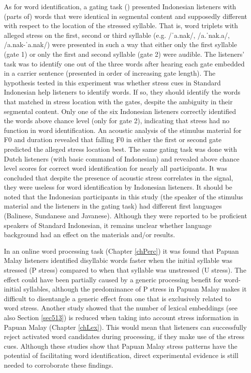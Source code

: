 As for word identification, a gating task (\citealt{vanzanten_word_1998}) presented Indonesian listeners with (parts of) words that were identical in segmental content and supposedly different with respect to the location of the stressed syllable. That is, word triplets with alleged stress on the first, second or third syllable (e.g. /ˈa.nak/, /a.ˈnak.a/, /a.nak-ˈa.nak/) were presented in such a way that either only the first syllable (gate 1) or only the first and second syllable (gate 2) were audible. The listeners' task was to identify one out of the three words after hearing each gate embedded in a carrier sentence (presented in order of increasing gate length). The hypothesis tested in this experiment was whether stress cues in Standard Indonesian help listeners to identify words. If so, they should identify the words that matched in stress location with the gates, despite the ambiguity in their segmental content. Only one of the six Indonesian listeners correctly identified the words above chance level (only for gate 2), indicating that stress had no function in word identification. An acoustic analysis of the stimulus material for F0 and duration revealed that falling F0 in either the first or second gate predicted the alleged stress location best. The same gating task was done with Dutch listeners (with basic command of Indonesian) and revealed above chance level scores for correct word identification for nearly all participants. It was concluded that despite the presence of acoustic stress correlates in the signal, they were useless for word identification by Indonesian listeners. It should be noted that the Indonesian participants in this study (the speaker of the stimulus material and the listeners in the gating task) had different first languages (Balinese, Sundanese and Javanese). Although they were reported to be proficient speakers of Standard Indonesian, it remains unclear whether language background had an effect on the materials and/or results. \par

In an online word processing task (Chapter \ref{chPerc}) it was found that Papuan Malay listeners identified disyllabic words faster when the initial syllable was stressed (P stress) compared to when that syllable was unstressed (U stress). The effect could have been partially caused by a generic processing benefit for word-initial syllables, although the predominance of P stress in Papuan Malay makes it difficult to disentangle a generic effect from one that is exclusively related to word stress. Another study showed that the number of lexical embeddings (see also Section \ref{sec513}) is reduced when taking into account stress information in Papuan Malay (Chapter \ref{chLex}). This would mean that listeners can successfully reject activated word candidates during processing, if they make use of the stress cues. Although these studies show that Papuan Malay stress patterns have the potential of facilitating word identification, direct experimental evidence is still needed to corroborate these findings.


